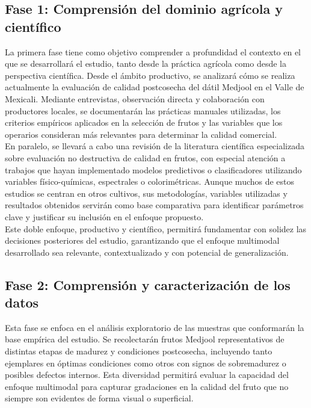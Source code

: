 \subsection{Fase 1: Comprensión del dominio agrícola y científico}

La primera fase tiene como objetivo comprender a profundidad el contexto en el que se desarrollará el estudio, tanto desde la práctica agrícola como desde la perspectiva científica. Desde el ámbito productivo, se analizará cómo se realiza actualmente la evaluación de calidad postcosecha del dátil Medjool en el Valle de Mexicali. Mediante entrevistas, observación directa y colaboración con productores locales, se documentarán las prácticas manuales utilizadas, los criterios empíricos aplicados en la selección de frutos y las variables que los operarios consideran más relevantes para determinar la calidad comercial.\\

En paralelo, se llevará a cabo una revisión de la literatura científica especializada sobre evaluación no destructiva de calidad en frutos, con especial atención a trabajos que hayan implementado modelos predictivos o clasificadores utilizando variables físico-químicas, espectrales o colorimétricas. Aunque muchos de estos estudios se centran en otros cultivos, sus metodologías, variables utilizadas y resultados obtenidos servirán como base comparativa para identificar parámetros clave y justificar su inclusión en el enfoque propuesto.\\

Este doble enfoque, productivo y científico, permitirá fundamentar con solidez las decisiones posteriores del estudio, garantizando que el enfoque multimodal desarrollado sea relevante, contextualizado y con potencial de generalización.

\subsection{Fase 2: Comprensión y caracterización de los datos}

Esta fase se enfoca en el análisis exploratorio de las muestras que conformarán la base empírica del estudio. Se recolectarán frutos Medjool representativos de distintas etapas de madurez y condiciones postcosecha, incluyendo tanto ejemplares en óptimas condiciones como otros con signos de sobremadurez o posibles defectos internos. Esta diversidad permitirá evaluar la capacidad del enfoque multimodal para capturar gradaciones en la calidad del fruto que no siempre son evidentes de forma visual o superficial.\\

